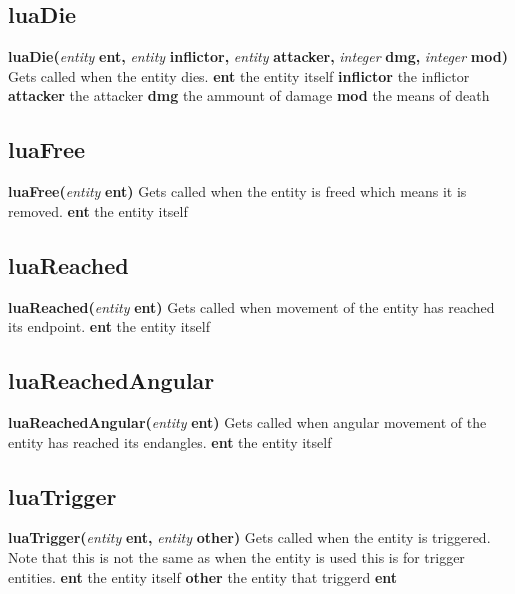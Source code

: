 \documentclass{scrreprt}
\begin{document}
\subsection{luaDie}
\label{luaDie}
\textbf{luaDie(}\textit{entity} \textbf{ent,} \textit{entity} \textbf{inflictor,} \textit{entity} \textbf{attacker,} \textit{integer} \textbf{dmg,} \textit{integer}\textbf{ mod)}
\newline
Gets called when the entity dies.
\newline
\textbf{ent} the entity itself
\newline
\textbf{inflictor} the inflictor
\newline
\textbf{attacker} the attacker
\newline
\textbf{dmg} the ammount of damage
\newline
\textbf{mod} the means of death
\subsection{luaFree}
\label{luaFree}
\textbf{luaFree(}\textit{entity} \textbf{ent)}
\newline
Gets called when the entity is freed which means it is removed.
\newline
\textbf{ent} the entity itself
\subsection{luaReached}
\label{luaReached}
\textbf{luaReached(}\textit{entity }\textbf{ent)}
\newline
Gets called when movement of the entity has reached its endpoint.
\newline
\textbf{ent} the entity itself
\subsection{luaReachedAngular}
\label{luaReachedAngular}
\textbf{luaReachedAngular(}\textit{entity }\textbf{ent)}
\newline
Gets called when angular movement of the entity has reached its endangles.
\newline
\textbf{ent} the entity itself
\subsection{luaTrigger}
\label{luaTrigger}
\textbf{luaTrigger(}\textit{entity}\textbf{ ent, }\textit{entity}\textbf{ other)}
\newline
Gets called when the entity is triggered. Note that this is not the same as when the entity is used this is for trigger entities.
\newline
\textbf{ent} the entity itself
\newline
\textbf{other} the entity that triggerd \textbf{ent}
\end{document}
